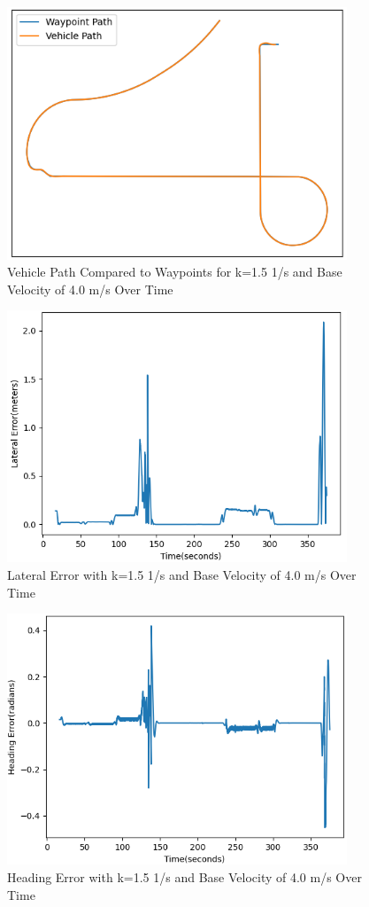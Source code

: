 \documentclass[titlepage,draft]{article}
\begin{document}
{\begin{figure}
	\centering
	\includegraphics[width=4in]{waypoints_k-15_v-4}
	\caption{Vehicle Path Compared to Waypoints for k=1.5 1/s and Base Velocity of 4.0 m/s Over Time}
	\label{fig:waypointsk10v4}
\end{figure}

\begin{figure}
	\centering
	\includegraphics[width=4in]{lateral_k-15_v-4}
	\caption{Lateral Error with k=1.5 1/s and Base Velocity of 4.0 m/s Over Time}
	\label{fig:lateralk10v4}
\end{figure}

\begin{figure}
	\centering
	\includegraphics[width=4in]{heading_k-15_v-4}
	\caption{Heading Error with k=1.5 1/s and Base Velocity of 4.0 m/s Over Time}
	\label{fig:headingk10v4}
\end{figure}

}
\end{document}
